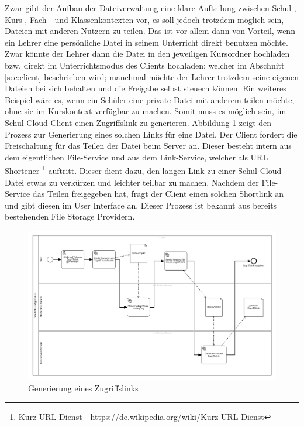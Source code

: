 Zwar gibt der Aufbau der Dateiverwaltung eine klare Aufteilung zwischen Schul-, Kurs-, Fach - und Klassenkontexten vor, es soll jedoch trotzdem möglich sein, Dateien mit anderen Nutzern zu teilen. Das ist vor allem dann von Vorteil, wenn ein Lehrer eine persönliche Datei in seinem Unterricht direkt benutzen möchte. Zwar könnte der Lehrer dann die Datei in den jeweiligen Kursordner hochladen bzw. direkt im Unterrichtsmodus des Clients hochladen; welcher im Abschnitt \ref{sec:client} beschrieben wird; manchmal möchte der Lehrer trotzdem seine eigenen Dateien bei sich behalten und die Freigabe selbst steuern können. Ein weiteres Beispiel wäre es, wenn ein Schüler eine private Datei mit anderem teilen möchte, ohne sie im Kurskontext verfügbar zu machen. Somit muss es möglich sein, im Schul-Cloud Client einen Zugriffslink zu generieren. Abbildung \ref{fig:filesharinggeneration} zeigt den Prozess zur Generierung eines solchen Links für eine Datei. Der Client fordert die Freischaltung für das Teilen der Datei beim Server an. Dieser besteht intern aus dem eigentlichen File-Service und aus dem Link-Service, welcher als URL  Shortener \footnote{Kurz-URL-Dienst - \url{https://de.wikipedia.org/wiki/Kurz-URL-Dienst}} auftritt. Dieser dient dazu, den langen Link zu einer Schul-Cloud Datei etwas zu verkürzen und leichter teilbar zu machen. Nachdem der File-Service das Teilen freigegeben hat, fragt der Client einen solchen Shortlink an und gibt diesen im User Interface an. Dieser Prozess ist bekannt aus bereits bestehenden File Storage Providern.

\begin{figure}[H]
	\includegraphics[width=1\linewidth]{images/filesharinggeneration}
	\caption[Caption for concept]{Generierung eines Zugriffslinks}
	\centering
	\label{fig:filesharinggeneration}
\end{figure}

